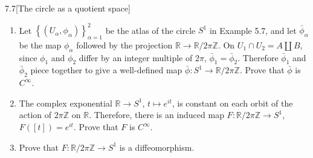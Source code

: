 \begin{problem}{7.7}[The circle as a quotient space]
\begin{enumerate}[label={(\alph*)},leftmargin=*]
	\item Let \( {\left\{ (U_{\alpha}, \phi_{\alpha}) \right\}}^{2}_{\alpha=1} \) be the atlas of the circle \( S^{1} \) in Example 5.7, and let \( \bar{\phi}_{\alpha} \) be the map \( \phi_{\alpha} \) followed by the projection \( \mathbb{R} \to \mathbb{R}/2\pi\mathbb{Z} \). On \( U_{1} \cap U_{2} = A \amalg B \), since \( \phi_{1} \) and \( \phi_{2} \) differ by an integer multiple of \( 2\pi \), \( \bar{\phi}_{1} = \bar{\phi}_{2} \). Therefore \( \bar{\phi}_{1} \) and \( \bar{\phi}_{2} \) piece together to give a well-defined map \( \bar{\phi}: S^{1} \to \mathbb{R}/2\pi\mathbb{Z} \). Prove that \( \bar{\phi} \) is \( C^{\infty} \).
	\item The complex exponential \( \mathbb{R} \to S^{1} \), \( t \mapsto e^{it} \), is constant on each orbit of the action of \( 2\pi\mathbb{Z} \) on \( \mathbb{R} \). Therefore, there is an induced map \( F: \mathbb{R}/2\pi\mathbb{Z} \to S^{1} \), \( F([t]) = e^{it} \). Prove that \( F \) is \( C^{\infty} \).
	\item Prove that \( F: \mathbb{R}/2\pi\mathbb{Z} \to S^{1} \) is a diffeomorphism.
\end{enumerate}
\end{problem}

